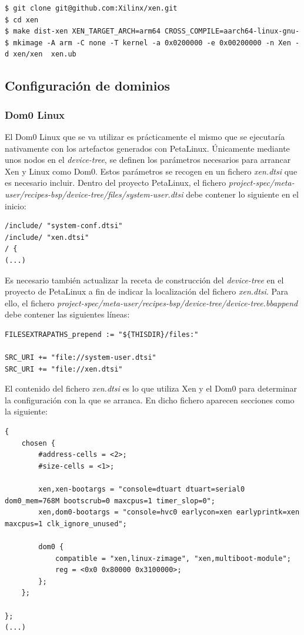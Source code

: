 \begin{lstlisting}[style=CStyle]
$ git clone git@github.com:Xilinx/xen.git
$ cd xen
$ make dist-xen XEN_TARGET_ARCH=arm64 CROSS_COMPILE=aarch64-linux-gnu-
$ mkimage -A arm -C none -T kernel -a 0x0200000 -e 0x00200000 -n Xen -d xen/xen  xen.ub
\end{lstlisting}

\subsection{Configuración de dominios}
\subsubsection{Dom0 Linux} \label{xen_dom0_config}

El Dom0 Linux que se va utilizar es prácticamente el mismo que se ejecutaría nativamente con los artefactos generados con PetaLinux. Únicamente mediante unos nodos en el \textit{device-tree}, se definen los parámetros necesarios para arrancar Xen y Linux como Dom0. Estos parámetros se recogen en un fichero \textit{xen.dtsi} que es necesario incluir. Dentro del proyecto PetaLinux, el fichero \textit{project-spec/meta-user/recipes-bsp/device-tree/files/system-user.dtsi} debe contener lo siguiente en el inicio:

\begin{lstlisting}[style=CStyle]
/include/ "system-conf.dtsi"
/include/ "xen.dtsi"
/ {
(...)
\end{lstlisting}

Es necesario también actualizar la receta de construcción del \textit{device-tree} en el proyecto de PetaLinux a fin de indicar la localización del fichero \textit{xen.dtsi}. Para ello, el fichero \textit{project-spec/meta-user/recipes-bsp/device-tree/device-tree.bbappend} debe contener las siguientes líneas:

\begin{lstlisting}[style=CStyle]
FILESEXTRAPATHS_prepend := "${THISDIR}/files:"

SRC_URI += "file://system-user.dtsi"
SRC_URI += "file://xen.dtsi"
\end{lstlisting}

El contenido del fichero \textit{xen.dtsi} es lo que utiliza Xen y el Dom0 para determinar la configuración con la que se arranca. En dicho fichero aparecen secciones como la siguiente:

\begin{lstlisting}[style=CStyle]
{
	chosen {
		#address-cells = <2>;
		#size-cells = <1>;

		xen,xen-bootargs = "console=dtuart dtuart=serial0 dom0_mem=768M bootscrub=0 maxcpus=1 timer_slop=0";
		xen,dom0-bootargs = "console=hvc0 earlycon=xen earlyprintk=xen maxcpus=1 clk_ignore_unused";

		dom0 {
			compatible = "xen,linux-zimage", "xen,multiboot-module";
			reg = <0x0 0x80000 0x3100000>;
		};
	};

};
(...)
\end{lstlisting}

